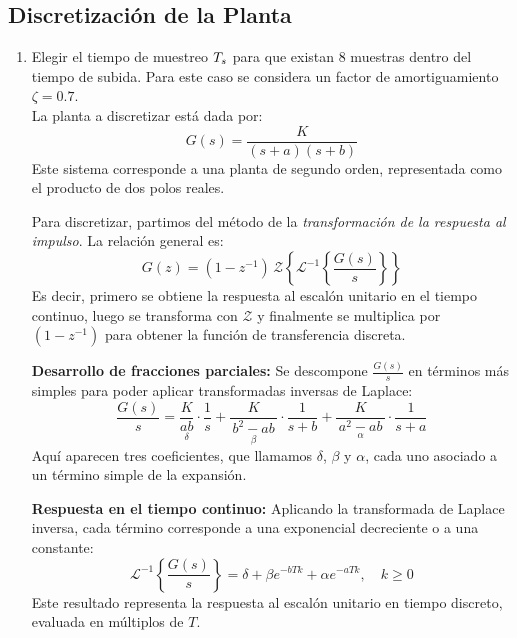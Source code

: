 \subsection{Discretización de la Planta}
\begin{enumerate}[label=2.\arabic*.]
	\item Elegir el tiempo de muestreo $T_s$ para que existan 8 muestras dentro del tiempo de subida. Para este caso se considera un factor de amortiguamiento $\zeta = 0.7$. \\
	
	La planta a discretizar está dada por:
	\begin{equation}
		G(s) = \frac{K}{(s+a)(s+b)}
	\end{equation}
	Este sistema corresponde a una planta de segundo orden, representada como el producto de dos polos reales.
	
	Para discretizar, partimos del método de la \emph{transformación de la respuesta al impulso}. La relación general es:
	\begin{equation}
		G(z)=(1 - z^{-1})\,\mathcal{Z}\left\{ \mathcal{L}^{-1}\left\{ \frac{G(s)}{s} \right\} \right\}
	\end{equation}
	Es decir, primero se obtiene la respuesta al escalón unitario en el tiempo continuo, luego se transforma con $\mathcal{Z}$ y finalmente se multiplica por $(1-z^{-1})$ para obtener la función de transferencia discreta.
	
	\vspace{0.5em}
	\textbf{Desarrollo de fracciones parciales:}  
	Se descompone $\tfrac{G(s)}{s}$ en términos más simples para poder aplicar transformadas inversas de Laplace:
	\begin{equation}
		\frac{G(s)}{s} =
		\underset{\delta}{\frac{K}{ab}} \cdot \frac{1}{s}
		+ \underset{\beta}{\frac{K}{\,b^2-ab\,}} \cdot \frac{1}{s+b}
		+ \underset{\alpha}{\frac{K}{\,a^2-ab\,}} \cdot \frac{1}{s+a}
	\end{equation}
	Aquí aparecen tres coeficientes, que llamamos $\delta$, $\beta$ y $\alpha$, cada uno asociado a un término simple de la expansión.
	
	\vspace{0.5em}
	\textbf{Respuesta en el tiempo continuo:}  
	Aplicando la transformada de Laplace inversa, cada término corresponde a una exponencial decreciente o a una constante:
	\begin{equation}
		\mathcal{L}^{-1} \left\{\frac{G(s)}{s}\right\}=\delta + \beta e^{-bTk}+\alpha e^{-aTk}, \quad k \geq 0
	\end{equation}
	Este resultado representa la respuesta al escalón unitario en tiempo discreto, evaluada en múltiplos de $T$.
	

\end{enumerate}
